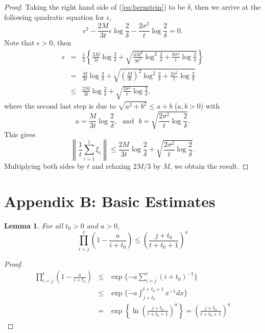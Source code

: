 \documentclass[twoside,11pt]{amsart}
\theoremstyle{theorem}
\newtheorem{lem}[thm]{Lemma}
\theoremstyle{definition}
\theoremstyle{remark}
\def\t{t_0}
\begin{document}
\begin{proof}
Taking the right hand side of (\ref{eq:bernstein}) to be $\delta$, then we arrive at the following quadratic equation for $\epsilon$,
\[ \epsilon^2 - \frac{2 M }{3t}\epsilon \log\frac{2}{\delta} - \frac{2 \sigma^2}{t} \log\frac{2}{\delta} = 0. \]
Note that $\epsilon>0$, then
\begin{eqnarray*}
\epsilon & = & \frac{1}{2} \left\{ \frac{2M}{3t}   \log\frac{2}{\delta} + \sqrt{\frac{4M^2}{9t^2}   \log^2\frac{2}{\delta} + \frac{8 \sigma^2}{t} \log\frac{2}{\delta}} \right\} \\
& = & \frac{M}{3t}   \log\frac{2}{\delta} + \sqrt{\left(\frac{M}{3 t}\right)^2   \log^2\frac{2}{\delta} + \frac{2 \sigma^2}{t} \log\frac{2}{\delta}} \\
& \leq & \frac{2M}{3 t}   \log\frac{2}{\delta}+ \sqrt{ \frac{2 \sigma^2}{t} \log\frac{2}{\delta}},
\end{eqnarray*}
where the second last step is due to $\sqrt{a^2 + b^2}\leq a + b$ ($a,b>0$) with 
$$a= \frac{M}{3 t}\log\frac{2}{\delta},\ \ \ \mbox{and} \ \ \  b=\sqrt{\frac{2\sigma^2}{t} \log\frac{2}{\delta}}. $$
This gives
\[ \left\|\frac{1}{t}\sum_{i=1}^t \xi_i \right\| \leq \frac{2M}{3t}\log\frac{2}{\delta} + \sqrt{\frac{2\sigma^2}{t} \log\frac{2}{\delta}}.   \]
Multiplying both sides by $t$ and relaxing $2M/3$ by $M$, we obtain the result.  
\end{proof}




\section*{Appendix B: Basic Estimates}
\renewcommand{\thesection}{B}
\setcounter{equation}{0} \setcounter{thm}{0}
\renewcommand{\thethm}{B.\arabic{thm}}
\renewcommand{\theequation}{B-\arabic{equation}}


\begin{lem} \label{lem:pibnd} For all $\t>0$ and $a>0$,
\[ \prod_{i=j}^t \left(1 - \frac{a}{i+\t} \right) \leq \left(\frac{j+\t}{t+\t+1} \right)^a \]
\end{lem}

\begin{proof}
\begin{eqnarray*}
\prod_{i=j}^t \left(1 - \frac{a}{i+\t} \right)  & \leq & \exp\{ - a \sum_{i=j}^t (i+\t)^{-1} \} \\
& \leq & \exp\{-a\int_{j+\t}^{t+\t+1} x^{-1} d x\} \\
& = & \exp \left\{\ln\left(\frac{j+\t}{t+\t+1} \right)^a
\right\} =\left(\frac{j+\t}{t+\t+1} \right)^a
\end{eqnarray*}
\end{proof}
\end{document}
